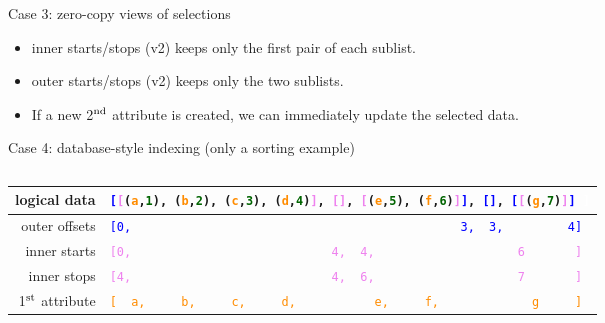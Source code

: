 \documentclass[aspectratio=169]{beamer}
\begin{document}
\begin{frame}{Case 3: zero-copy views of selections}
\vspace{0.25 cm}
\begin{itemize}
\item inner starts/stops (v2) keeps only the first pair of each sublist.
\item outer starts/stops (v2) keeps only the two sublists.
\item<2-> If a new 2$^{\mbox{\scriptsize nd}}$ attribute is created, we can immediately update the selected data.
\end{itemize}
\end{frame}

\begin{frame}{Case 4: database-style indexing (only a sorting example)}
\vspace{0.5 cm}

\begin{columns}
\begin{tabular}{r l}
\small logical data & {\tt\scriptsize \textcolor{blue}{[}\textcolor{violet}{[}(\textcolor{darkorange}{a},\textcolor{darkgreen}{1}), (\textcolor{darkorange}{b},\textcolor{darkgreen}{2}), (\textcolor{darkorange}{c},\textcolor{darkgreen}{3}), (\textcolor{darkorange}{d},\textcolor{darkgreen}{4})\textcolor{violet}{]}, \textcolor{violet}{[]}, \textcolor{violet}{[}(\textcolor{darkorange}{e},\textcolor{darkgreen}{5}), (\textcolor{darkorange}{f},\textcolor{darkgreen}{6})\textcolor{violet}{]}\textcolor{blue}{]}, \textcolor{blue}{[]}, \textcolor{blue}{[}\textcolor{violet}{[}(\textcolor{darkorange}{g},\textcolor{darkgreen}{7})\textcolor{violet}{]}\textcolor{blue}{]}\ \textcolor{white}{]}} \\\hline
\small outer offsets & {\tt\scriptsize \textcolor{blue}{[0,\ \ \ \ \ \ \ \ \ \ \ \ \ \ \ \ \ \ \ \ \ \ \ \ \ \ \ \ \ \ \ \ \ \ \ \ \ \ \ \ \ \ \ \ \ \ 3,\ \ 3,\ \ \ \ \ \ \ \ \ 4]}} \\
\small inner starts & {\tt\scriptsize \textcolor{violet}{[0,\ \ \ \ \ \ \ \ \ \ \ \ \ \ \ \ \ \ \ \ \ \ \ \ \ \ \ \ 4,\ \ 4,\ \ \ \ \ \ \ \ \ \ \ \ \ \ \ \ \ \ \ \ 6\ \ \ \ \ \ \ ]}} \\
\small inner stops & {\tt\scriptsize \textcolor{violet}{[4,\ \ \ \ \ \ \ \ \ \ \ \ \ \ \ \ \ \ \ \ \ \ \ \ \ \ \ \ 4,\ \ 6,\ \ \ \ \ \ \ \ \ \ \ \ \ \ \ \ \ \ \ \ 7\ \ \ \ \ \ \ ]}} \\
\small 1$^{\mbox{\scriptsize st}}$ attribute & {\tt\scriptsize \textcolor{darkorange}{[\ \ a,\ \ \ \ \ b,\ \ \ \ \ c,\ \ \ \ \ d,\ \ \ \ \ \ \ \ \ \ \ e,\ \ \ \ \ f,\ \ \ \ \ \ \ \ \ \ \ \ \ g\ \ \ \ \ ]}} \\

\end{tabular}
\end{columns}
\end{frame}
\end{document}
